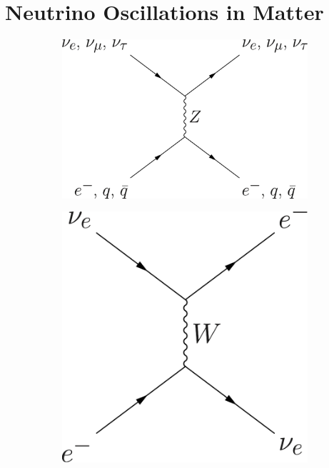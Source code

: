 \section{\label{chap:basics-sec:oscillations-matter}Neutrino Oscillations in Matter}

\begin{figure}[htbp]
\centering
	\begin{subfigure}[t]{0.40\textwidth}
		\centering
		\includegraphics[height=0.2\textheight]{chapters/assets/matter/neutral-current.png}
    \caption{  }
    \label{chap:matter-fig:nc}
	\end{subfigure}%
  \qquad
	\begin{subfigure}[t]{0.40\textwidth}
		\centering
		\includegraphics[height=0.2\textheight]{chapters/assets/matter/charged-current.png}

\end{subfigure}
\end{figure}
